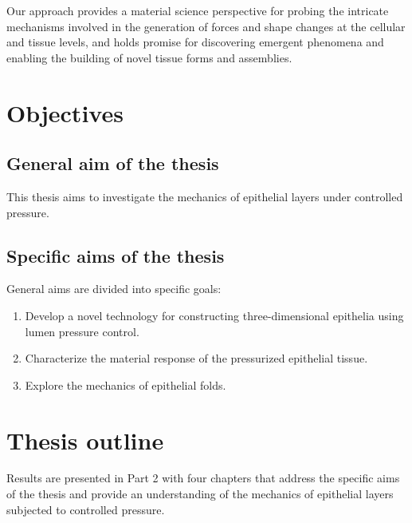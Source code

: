 Our approach provides a material science perspective for probing the intricate mechanisms involved in the generation of forces and shape changes at the cellular and tissue levels, and holds promise for discovering emergent phenomena and enabling the building of novel tissue forms and assemblies.  

\newpage

\hypertarget{objectives}{%
\section{Objectives}\label{objectives}}

\subsection*{General aim of the thesis} 

This thesis aims to investigate the mechanics of epithelial layers under controlled pressure.  

\subsection*{Specific aims of the thesis} 
General aims are divided into specific goals:

\begin{enumerate}
\def\labelenumi{\arabic{enumi}.}
\item  Develop a novel technology for constructing three-dimensional epithelia using lumen pressure control.  
\item  Characterize the material response of the pressurized epithelial tissue.  
\item  Explore the mechanics of epithelial folds.
\end{enumerate}

\hypertarget{thesis-outline}{%
\section{Thesis outline}\label{thesis-outline}}

Results are presented in Part 2 with four chapters that address the specific aims of the thesis and provide an understanding of the mechanics of epithelial layers subjected to controlled pressure.  

